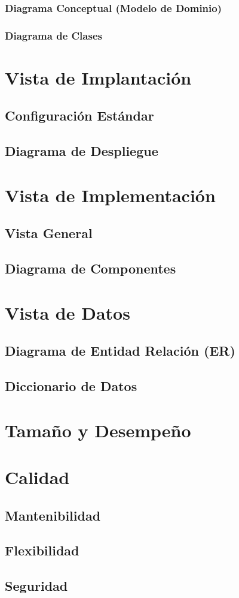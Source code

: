 \documentclass{article}
\begin{document}
    \subsubsection{Diagrama Conceptual (Modelo de Dominio)}
    \subsubsection{Diagrama de Clases}

    \section{Vista de Implantación} \label{vistaImplantacion}
    \subsection{Configuración Estándar}
    \subsection{Diagrama de Despliegue}


    \section{Vista de Implementación} \label{vistaImplementacion}
    \subsection{Vista General}
    \subsection{Diagrama de Componentes}


    \section{Vista de Datos} \label{vistaDatos}
    \subsection{Diagrama de Entidad Relación (ER)}
    \subsection{Diccionario de Datos}


    \section{Tamaño y Desempeño} \label{tamDesemp}

    \section{Calidad}
    \subsection{Mantenibilidad}
    \subsection{Flexibilidad}
    \subsection{Seguridad}
\end{document}
